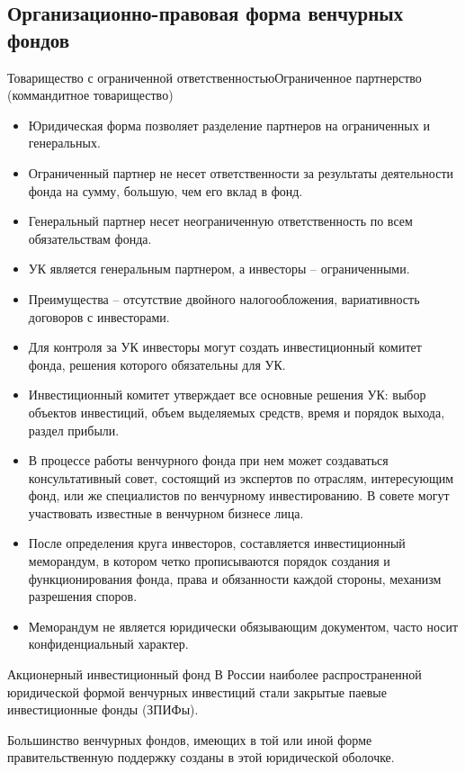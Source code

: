 \documentclass[_Venture_p1.tex]{subfiles}
\begin{document}
\subsection{Организационно-правовая форма венчурных фондов}
\begin{frame}[allowframebreaks]{Товарищество с ограниченной ответственностью}{Ограниченное партнерство (коммандитное товарищество)}
\begin{itemize}
	\item Юридическая форма позволяет разделение партнеров на ограниченных и генеральных. 
	\item Ограниченный партнер не несет ответственности за результаты деятельности фонда на сумму, большую, чем его вклад в фонд.
	\item Генеральный партнер несет неограниченную ответственность по всем обязательствам фонда. 

	\pagebreak
	\item УК является генеральным партнером, а инвесторы – ограниченными.
	\item Преимущества – отсутствие двойного налогообложения, вариативность договоров с инвесторами.
	\item Для контроля за УК инвесторы могут создать инвестиционный комитет фонда, решения которого обязательны для УК. 
	
	\pagebreak
	\item Инвестиционный комитет утверждает все основные решения УК: выбор объектов инвестиций, объем выделяемых средств, время и порядок выхода, раздел прибыли. 
	\item В процессе работы венчурного фонда при нем может создаваться консультативный совет, состоящий из экспертов по отраслям, интересующим фонд, или же специалистов по венчурному инвестированию. В совете могут участвовать известные в венчурном бизнесе лица.
	
	\pagebreak
	\item После определения круга инвесторов, составляется инвестиционный меморандум, в котором четко прописываются порядок создания и функционирования фонда, права и обязанности каждой стороны, механизм разрешения споров. 
	\item Меморандум не является юридически обязывающим документом, часто носит конфиденциальный характер.
	
\end{itemize}
\end{frame}

\begin{frame}{Акционерный инвестиционный фонд }
В России наиболее распространенной юридической формой венчурных инвестиций стали закрытые паевые инвестиционные фонды (ЗПИФы).

Большинство венчурных фондов, имеющих в той или иной форме правительственную поддержку созданы в этой юридической оболочке. 
\end{frame}
\end{document}
